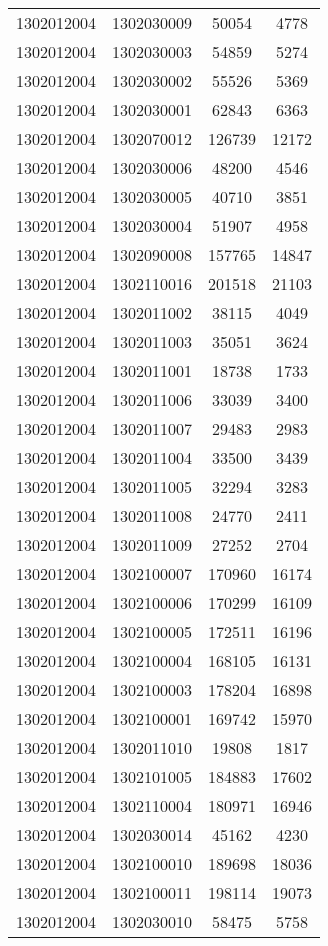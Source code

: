 \begin{longtable}[h]{llcc}
		1302012004 & 1302030009 & 50054 & 4778\\
		1302012004 & 1302030003 & 54859 & 5274\\
		1302012004 & 1302030002 & 55526 & 5369\\
		1302012004 & 1302030001 & 62843 & 6363\\
		1302012004 & 1302070012 & 126739 & 12172\\
		1302012004 & 1302030006 & 48200 & 4546\\
		1302012004 & 1302030005 & 40710 & 3851\\
		1302012004 & 1302030004 & 51907 & 4958\\
		1302012004 & 1302090008 & 157765 & 14847\\
		1302012004 & 1302110016 & 201518 & 21103\\
		1302012004 & 1302011002 & 38115 & 4049\\
		1302012004 & 1302011003 & 35051 & 3624\\
		1302012004 & 1302011001 & 18738 & 1733\\
		1302012004 & 1302011006 & 33039 & 3400\\
		1302012004 & 1302011007 & 29483 & 2983\\
		1302012004 & 1302011004 & 33500 & 3439\\
		1302012004 & 1302011005 & 32294 & 3283\\
		1302012004 & 1302011008 & 24770 & 2411\\
		1302012004 & 1302011009 & 27252 & 2704\\
		1302012004 & 1302100007 & 170960 & 16174\\
		1302012004 & 1302100006 & 170299 & 16109\\
		1302012004 & 1302100005 & 172511 & 16196\\
		1302012004 & 1302100004 & 168105 & 16131\\
		1302012004 & 1302100003 & 178204 & 16898\\
		1302012004 & 1302100001 & 169742 & 15970\\
		1302012004 & 1302011010 & 19808 & 1817\\
		1302012004 & 1302101005 & 184883 & 17602\\
		1302012004 & 1302110004 & 180971 & 16946\\
		1302012004 & 1302030014 & 45162 & 4230\\
		1302012004 & 1302100010 & 189698 & 18036\\
		1302012004 & 1302100011 & 198114 & 19073\\
		1302012004 & 1302030010 & 58475 & 5758\\

\end{longtable}
